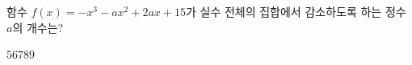 함수 $f(x)=-x^3-ax^2+2ax+15$가 실수 전체의 집합에서 감소하도록 하는 정수 $a$의 개수는?
\begin{choices32}{$5$}{$6$}{$7$}{$8$}{$9$}\end{choices32}
